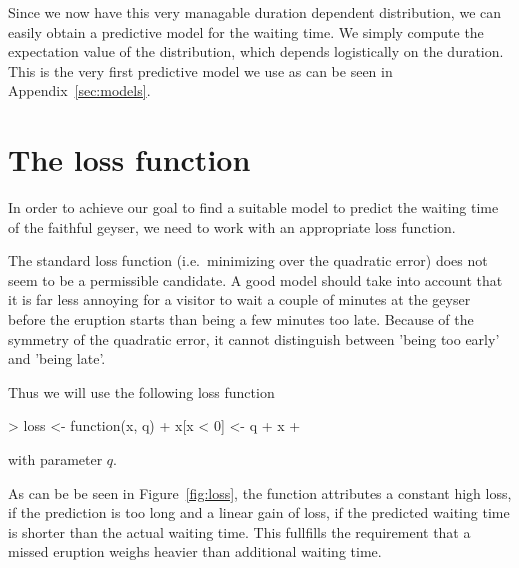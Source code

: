 \documentclass[english,final]{scrartcl}
\begin{document}
Since we now have this very managable duration dependent distribution, we can easily obtain a predictive model for the waiting time. We simply compute the expectation value of the distribution, which depends logistically on the duration. This is the very first predictive model we use as can be seen in Appendix~\ref{sec:models}.



\section{The loss function}
\label{sec:loss}

In order to achieve our goal to find a suitable model to predict the waiting time of the faithful geyser, we need to work with an appropriate loss function. 

The standard loss function (i.e.\ minimizing over the quadratic error) does not seem to be a permissible candidate. A good model should take into account that it is far less annoying for a visitor to wait a couple of minutes at the geyser before the eruption starts than being a few minutes too late. Because of the symmetry of the quadratic error, it cannot distinguish between 'being too early' and 'being late'. 

Thus we will use the following loss function
\begin{Schunk}
\begin{Sinput}
> loss <- function(x, q){
+   x[x < 0] <- q
+   x
+ }
\end{Sinput}
\end{Schunk}
with parameter $q$.

As can be be seen in Figure~\ref{fig:loss}, the function attributes a constant high loss, if the prediction is too long and a linear gain of loss, if the predicted waiting time is shorter than the actual waiting time. This fullfills the requirement that a missed eruption weighs heavier than additional waiting time.
\end{document}
